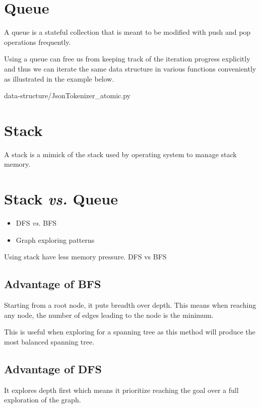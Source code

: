\section{Queue}\label{sec:queue}

A queue is a stateful collection that is meant to be modified with push and pop operations
frequently.

Using a queue can free us from keeping track of the iteration progress explicitly and thus we can
iterate the same data structure in various functions conveniently as illustrated in the example
below.

{data-structure/JsonTokenizer_atomic.py}

\section{Stack}\label{sec:stack}
A stack is a mimick of the stack used by operating system to manage stack memory.

\section{Stack \textit{vs.} Queue}
\begin{itemize}
    \item DFS \textit{vs.} BFS \label{Evernote:DFS vs BFS}
    \item Graph exploring patterns
\end{itemize}

Using stack have less memory pressure.
DFS vs BFS

\subsection{Advantage of BFS}
Starting from a root node, it puts breadth over depth.
This means when reaching any node, the number of edges leading to the node is the minimum.

This is useful when exploring for a spanning tree as this method will produce the most balanced
spanning tree.

\subsection{Advantage of DFS}

It explores depth first which means it prioritize reaching the goal over a full exploration of
the graph.

